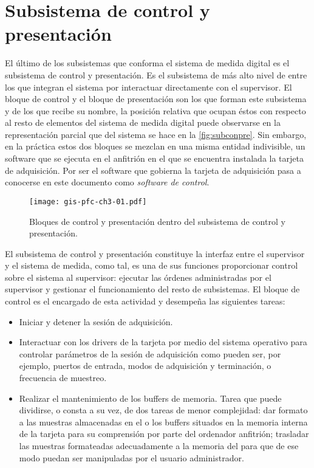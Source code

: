 \chapter{Subsistema de control y presentación}\label{chap:control}

El último de los subsistemas que conforma el sistema de medida digital es
el subsistema de control y presentación. Es el subsistema de más alto nivel
de entre los que integran el sistema por interactuar directamente con el
supervisor. El bloque de control y el bloque de presentación son los que
forman este subsistema y de los que recibe su nombre, la posición relativa
que ocupan éstos con respecto al resto de elementos del sistema de medida
digital puede observarse en la representación parcial que del sistema se
hace en la \vref{fig:subconpre}. Sin embargo, en la práctica estos dos
bloques se mezclan en una misma entidad indivisible, un software que se
ejecuta en el \pc{} anfitrión en el que se encuentra instalada la tarjeta
de adquisición. Por ser el software que gobierna la tarjeta de adquisición
pasa a conocerse en este documento como \emph{software de control}.

\begin{figure}
	\begin{center}
		\texttt{[image: gis-pfc-ch3-01.pdf]}
	\end{center}
	\caption[Subsistema de control y presentación] {Bloques de control
	y presentación dentro del subsistema de control y presentación.}
	\label{fig:subconpre}
\end{figure}

El subsistema de control y presentación constituye la interfaz entre el
supervisor y el sistema de medida, como tal, es una de sus funciones
proporcionar control sobre el sistema al supervisor: ejecutar las órdenes
administradas por el supervisor y gestionar el funcionamiento del resto de
subsistemas. El bloque de control es el encargado de esta actividad y
desempeña las siguientes tareas:

\begin{itemize}
	\item Iniciar y detener la sesión de adquisición.
	\item Interactuar con los drivers de la tarjeta por medio del
		sistema operativo para controlar parámetros de la sesión de
		adquisición como pueden ser, por ejemplo, puertos de
		entrada, modos de adquisición y terminación, o frecuencia
		de muestreo.
	\item Realizar el mantenimiento de los buffers de memoria. Tarea
		que puede dividirse, o consta a su vez, de dos tareas de
		menor complejidad: dar formato a las muestras almacenadas
		en el o los buffers situados en la memoria interna de la
		tarjeta para su comprensión por parte del ordenador
		anfitrión; trasladar las muestras formateadas adecuadamente
		a la memoria del \pc{} para que de ese modo puedan ser
		manipuladas por el usuario administrador.
\end{itemize}

